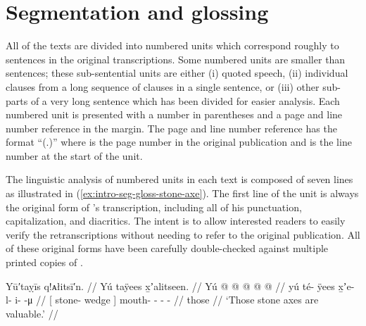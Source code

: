 

\section{Segmentation and glossing}\label{sec:intro-seg-gloss}

All of the texts are divided into numbered units which correspond roughly to sentences in the original transcriptions.
Some numbered units are smaller than sentences; these sub-sentential units are either (i) quoted speech, (ii) individual clauses from a long sequence of clauses in a single sentence, or (iii) other sub-parts of a very long sentence which has been divided for easier analysis.
Each numbered unit is presented with a number in parentheses and a page and line number reference in the margin.
The page and line number reference has the format “(.)” where  is the page number in the original publication and  is the line number at the start of the unit.

The linguistic analysis of numbered units in each text is composed of seven lines as illustrated in (\ref{ex:intro-seg-gloss-stone-axe}).
The first line of the unit is always the original form of \citeauthor{swanton:1909}’s transcription, including all of his punctuation, capitalization, and diacritics.
The intent is to allow interested readers to easily verify the retranscriptions without needing to refer to the original publication.
All of these original forms have been carefully double-checked against multiple printed copies of \cite{swanton:1909}.

\ex\label{ex:intro-seg-gloss-stone-axe}%
%
\begingl
	\glpreamble{}%
		Yū′taỵīs q!ᴀłitsī′n. //
	\glpreamble{}%
		Yú taÿees x̱ʼalitseen. //
	\gla{}%
		{} Yú  @ {} {}  @ {} @ {} @ {} @ {} //
	\glb{}%
		{} yú té- ÿees {} x̱ʼe- l- i-  -μ //
	\glc{}%
		{}[  stone- wedge {}] mouth- - -  - //
	\gld{}%
		{} those  {} {}  {} {} {} {} //
	\glft{}%
		‘Those stone axes are valuable.’
		//
\endgl
\xe

